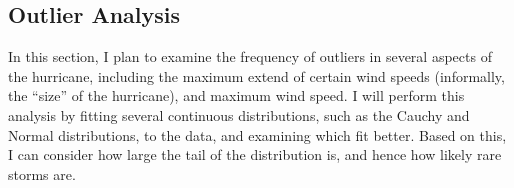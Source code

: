 \subsection{Outlier Analysis}

\par
In this section, I plan to examine the frequency of outliers in several aspects of the hurricane, including the maximum extend of certain wind speeds (informally, the ``size'' of the hurricane), and maximum wind speed.
I will perform this analysis by fitting several continuous distributions, such as the Cauchy and Normal distributions, to the data, and examining which fit better.
Based on this, I can consider how large the tail of the distribution is, and hence how likely rare storms are.